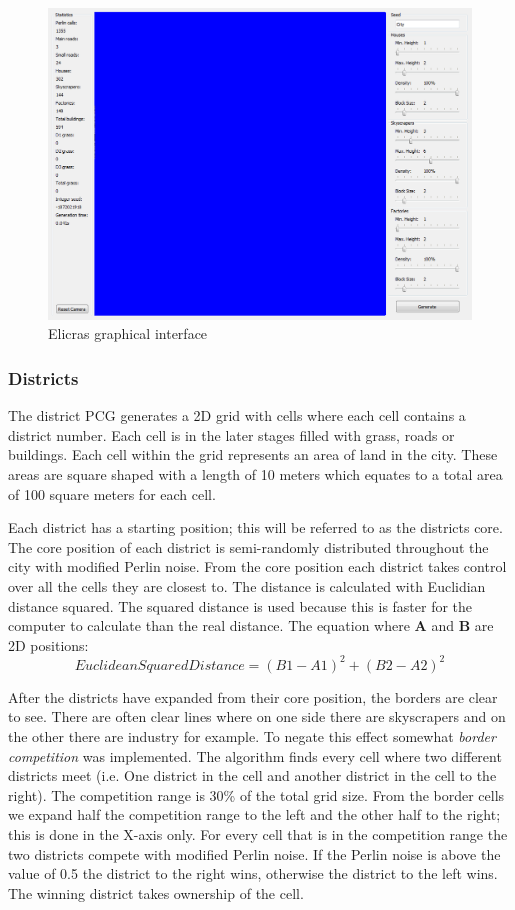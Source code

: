 		\begin{figure}
			\centering
			\includegraphics[width=0.5\linewidth]{"Images/interface"}
			\caption{Elicras graphical interface}
			\label{fig:elicras-interface}
		\end{figure}
		
		\subsubsection{Districts}
		The district PCG generates a 2D grid with cells where each cell contains a district number. Each cell is in the later stages filled with grass, roads or buildings. Each cell within the grid represents an area of land in the city. These areas are square shaped with a length of 10 meters which equates to a total area of 100 square meters for each cell.
		
		\par
		Each district has a starting position; this will be referred to as the districts core. The core position of each district is semi-randomly distributed throughout the city with modified Perlin noise. From the core position each district takes control over all the cells they are closest to. The distance is calculated with Euclidian distance squared. The squared distance is used because this is faster for the computer to calculate than the real distance. The equation where \textbf{A} and \textbf{B} are 2D positions:
		\begin{equation}
			EuclideanSquaredDistance = (B1 - A1)^2 + (B2 - A2)^2
		\end{equation}
		
		\par
		After the districts have expanded from their core position, the borders are clear to see. There are often clear lines where on one side there are skyscrapers and on the other there are industry for example. To negate this effect somewhat \textit{border competition} was implemented. The algorithm finds every cell where two different districts meet (i.e. One district in the cell and another district in the cell to the right). The competition range is 30\% of the total grid size. From the border cells we expand half the competition range to the left and the other half to the right; this is done in the X-axis only. For every cell that is in the competition range the two districts compete with modified Perlin noise. If the Perlin noise is above the value of 0.5 the district to the right wins, otherwise the district to the left wins. The winning district takes ownership of the cell.
		
